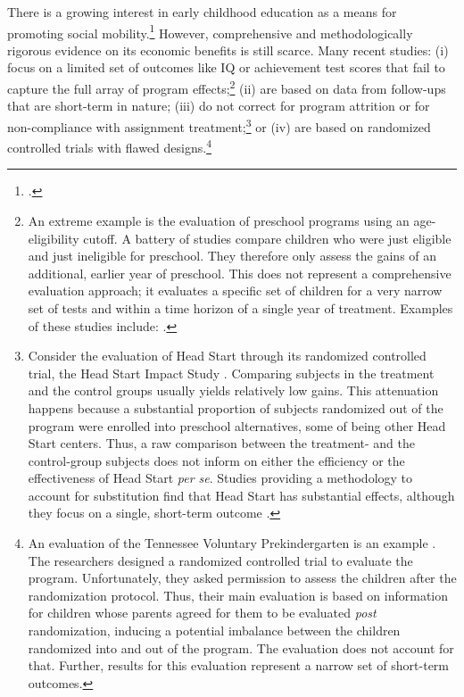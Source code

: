 There is a growing interest in early childhood education as a means for promoting social mobility.\footnote{\citet{Bajaj_Labaton_2009_ObamaRiskAssets,White_House_2014_Econ_of_EC_Investments,White_House_2014_Fact_Sheet_Press}.} However, comprehensive and methodologically rigorous evidence on its economic benefits is still scarce. Many recent studies: (i) focus on a limited set of outcomes like IQ or achievement test scores that fail to capture the full array of program effects;\footnote{An extreme example is the evaluation of preschool programs using an age-eligibility cutoff. A battery of studies compare children who were just eligible and just ineligible for preschool. They therefore only assess the gains of an additional, earlier year of preschool. This does not represent a comprehensive evaluation approach; it evaluates a specific set of children for a very narrow set of tests and within a time horizon of a single year of treatment. Examples of these studies include: \citet{Gormley_Gayer_2005_JHR,Gormley_Gayer_etal_2005_DP,Weiland_2013_CD_Impacts-of-Pre-K}.} (ii) are based on data from follow-ups that are short-term in nature; (iii) do not correct for program attrition or for non-compliance with assignment treatment;\footnote{Consider the evaluation of Head Start through its randomized controlled trial, the Head Start Impact Study \citep{Puma_Bell_etal_2010_HeadStartImpact}. Comparing subjects in the treatment and the control groups usually yields relatively low gains. This attenuation happens because a substantial proportion of subjects randomized out of the program were enrolled into preschool alternatives, some of being other Head Start centers. Thus, a raw comparison between the treatment- and the control-group subjects does not inform on either the efficiency or the effectiveness of Head Start \emph{per se}. Studies providing a methodology to account for substitution find that Head Start has substantial effects, although they focus on a single, short-term outcome \citep{Kline_Walters_2015_NBER-Evaluating,Feller_Grindal_etal_2016_ComparedtoWhat}.} or (iv) are based on randomized controlled trials with flawed designs.\footnote{An evaluation of the Tennessee Voluntary Prekindergarten is an example \citep{Lipsey_et_al_2013_Tennessee_Kindergrtn_PRI,Lipsey_et_al_2015_Randomized_Control_Trial_PRI}. The researchers designed a randomized controlled trial to evaluate the program. Unfortunately, they asked permission to assess the children after the randomization protocol. Thus, their main evaluation is based on information for children whose parents agreed for them to be evaluated \textit{post} randomization, inducing a potential imbalance between the children randomized into and out of the program. The evaluation does not account for that. Further, results for this evaluation represent a narrow set of short-term outcomes.}

